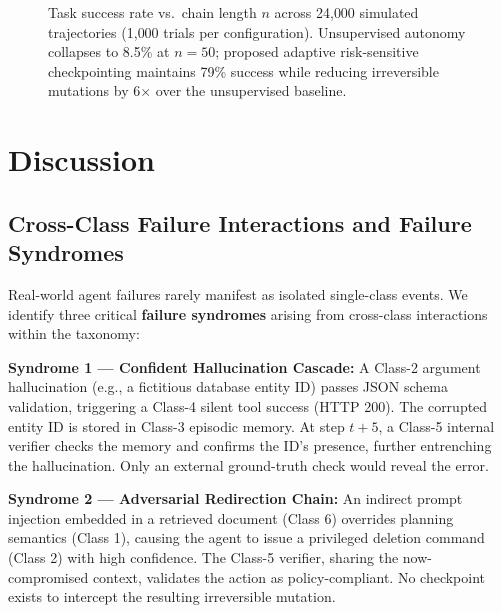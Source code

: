\documentclass[conference]{IEEEtran}
\begin{document}
\begin{figure}[h]
\caption{Task success rate vs.\ chain length $n$ across 24{,}000 simulated trajectories
(1{,}000 trials per configuration). Unsupervised autonomy collapses to 8.5\% at $n=50$;
proposed adaptive risk-sensitive checkpointing maintains 79\% success while reducing
irreversible mutations by 6$\times$ over the unsupervised baseline.}
\label{fig:trajectory_collapse}
\end{figure}

\section{Discussion}
\subsection{Cross-Class Failure Interactions and Failure Syndromes}
Real-world agent failures rarely manifest as isolated single-class events. We identify three critical \textbf{failure syndromes} arising from cross-class interactions within the taxonomy:

\textbf{Syndrome 1 --- Confident Hallucination Cascade:} A Class-2 argument hallucination (e.g., a fictitious database entity ID) passes JSON schema validation, triggering a Class-4 silent tool success (HTTP 200). The corrupted entity ID is stored in Class-3 episodic memory. At step $t+5$, a Class-5 internal verifier checks the memory and confirms the ID's presence, further entrenching the hallucination. Only an external ground-truth check would reveal the error.

\textbf{Syndrome 2 --- Adversarial Redirection Chain:} An indirect prompt injection embedded in a retrieved document (Class 6) overrides planning semantics (Class 1), causing the agent to issue a privileged deletion command (Class 2) with high confidence. The Class-5 verifier, sharing the now-compromised context, validates the action as policy-compliant. No checkpoint exists to intercept the resulting irreversible mutation.
\end{document}

